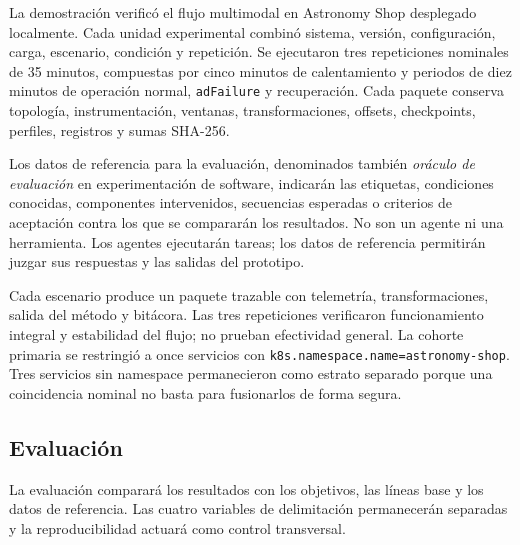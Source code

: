 \documentclass[conference]{IEEEtran}
\begin{document}
La demostración verificó el flujo multimodal en Astronomy Shop desplegado localmente. Cada unidad experimental combinó sistema, versión, configuración, carga, escenario, condición y repetición. Se ejecutaron tres repeticiones nominales de 35 minutos, compuestas por cinco minutos de calentamiento y periodos de diez minutos de operación normal, \texttt{adFailure} y recuperación. Cada paquete conserva topología, instrumentación, ventanas, transformaciones, offsets, checkpoints, perfiles, registros y sumas SHA-256.

Los datos de referencia para la evaluación, denominados también \textit{oráculo de evaluación} en experimentación de software, indicarán las etiquetas, condiciones conocidas, componentes intervenidos, secuencias esperadas o criterios de aceptación contra los que se compararán los resultados. No son un agente ni una herramienta. Los agentes ejecutarán tareas; los datos de referencia permitirán juzgar sus respuestas y las salidas del prototipo.

Cada escenario produce un paquete trazable con telemetría, transformaciones, salida del método y bitácora. Las tres repeticiones verificaron funcionamiento integral y estabilidad del flujo; no prueban efectividad general. La cohorte primaria se restringió a once servicios con \texttt{k8s.namespace.name=astronomy-shop}. Tres servicios sin namespace permanecieron como estrato separado porque una coincidencia nominal no basta para fusionarlos de forma segura.

\subsection{Evaluación}

La evaluación comparará los resultados con los objetivos, las líneas base y los datos de referencia. Las cuatro variables de delimitación permanecerán separadas y la reproducibilidad actuará como control transversal.
\end{document}
